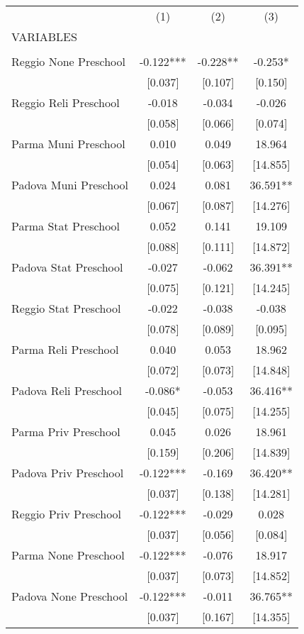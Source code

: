 \begin{tabular}{lccc} \hline
 & (1) & (2) & (3) \\
VARIABLES &  &  &  \\ \hline
 &  &  &  \\
Reggio None Preschool & -0.122*** & -0.228** & -0.253* \\
 & [0.037] & [0.107] & [0.150] \\
Reggio Reli Preschool & -0.018 & -0.034 & -0.026 \\
 & [0.058] & [0.066] & [0.074] \\
Parma Muni Preschool & 0.010 & 0.049 & 18.964 \\
 & [0.054] & [0.063] & [14.855] \\
Padova Muni Preschool & 0.024 & 0.081 & 36.591** \\
 & [0.067] & [0.087] & [14.276] \\
Parma Stat Preschool & 0.052 & 0.141 & 19.109 \\
 & [0.088] & [0.111] & [14.872] \\
Padova Stat Preschool & -0.027 & -0.062 & 36.391** \\
 & [0.075] & [0.121] & [14.245] \\
Reggio Stat Preschool & -0.022 & -0.038 & -0.038 \\
 & [0.078] & [0.089] & [0.095] \\
Parma Reli Preschool & 0.040 & 0.053 & 18.962 \\
 & [0.072] & [0.073] & [14.848] \\
Padova Reli Preschool & -0.086* & -0.053 & 36.416** \\
 & [0.045] & [0.075] & [14.255] \\
Parma Priv Preschool & 0.045 & 0.026 & 18.961 \\
 & [0.159] & [0.206] & [14.839] \\
Padova Priv Preschool & -0.122*** & -0.169 & 36.420** \\
 & [0.037] & [0.138] & [14.281] \\
Reggio Priv Preschool & -0.122*** & -0.029 & 0.028 \\
 & [0.037] & [0.056] & [0.084] \\
Parma None Preschool & -0.122*** & -0.076 & 18.917 \\
 & [0.037] & [0.073] & [14.852] \\
Padova None Preschool & -0.122*** & -0.011 & 36.765** \\
 & [0.037] & [0.167] & [14.355] \\

\end{tabular}
